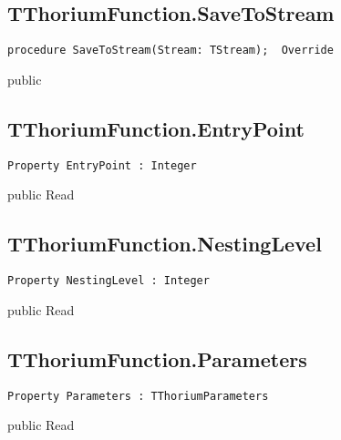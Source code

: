 \subsection{TThoriumFunction.SaveToStream}
\label{thoriumcore:thorium:tthoriumfunction:savetostream}
\begin{FPCList}
\Synopsis
\Declaration 

\begin{verbatim}
procedure SaveToStream(Stream: TStream);  Override
\end{verbatim}
\Visibility
public
\Description
\Errors
\end{FPCList}
\subsection{TThoriumFunction.EntryPoint}
\label{thoriumcore:thorium:tthoriumfunction:entrypoint}
\begin{FPCList}
\Synopsis
\Declaration 

\begin{verbatim}
Property EntryPoint : Integer
\end{verbatim}
\Visibility
public
\Access
Read
\Description
\end{FPCList}
\subsection{TThoriumFunction.NestingLevel}
\label{thoriumcore:thorium:tthoriumfunction:nestinglevel}
\begin{FPCList}
\Synopsis
\Declaration 

\begin{verbatim}
Property NestingLevel : Integer
\end{verbatim}
\Visibility
public
\Access
Read
\Description
\end{FPCList}
\subsection{TThoriumFunction.Parameters}
\label{thoriumcore:thorium:tthoriumfunction:parameters}
\begin{FPCList}
\Synopsis
\Declaration 

\begin{verbatim}
Property Parameters : TThoriumParameters
\end{verbatim}
\Visibility
public
\Access
Read
\Description
\end{FPCList}
